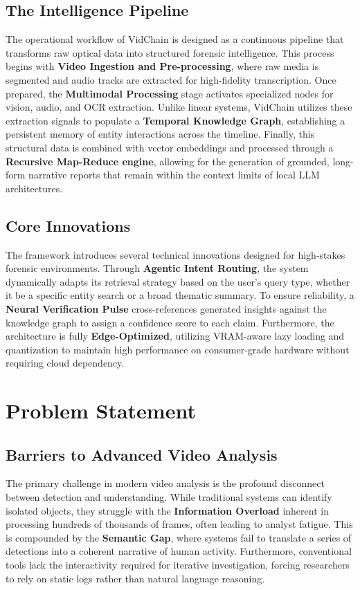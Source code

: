 \subsection{The Intelligence Pipeline}
The operational workflow of VidChain is designed as a continuous pipeline that transforms raw optical data into structured forensic intelligence. This process begins with \textbf{Video Ingestion and Pre-processing}, where raw media is segmented and audio tracks are extracted for high-fidelity transcription. Once prepared, the \textbf{Multimodal Processing} stage activates specialized nodes for vision, audio, and OCR extraction. Unlike linear systems, VidChain utilizes these extraction signals to populate a \textbf{Temporal Knowledge Graph}, establishing a persistent memory of entity interactions across the timeline. Finally, this structural data is combined with vector embeddings and processed through a \textbf{Recursive Map-Reduce engine}, allowing for the generation of grounded, long-form narrative reports that remain within the context limits of local LLM architectures.

\subsection{Core Innovations}
The framework introduces several technical innovations designed for high-stakes forensic environments. Through \textbf{Agentic Intent Routing}, the system dynamically adapts its retrieval strategy based on the user's query type, whether it be a specific entity search or a broad thematic summary. To ensure reliability, a \textbf{Neural Verification Pulse} cross-references generated insights against the knowledge graph to assign a confidence score to each claim. Furthermore, the architecture is fully \textbf{Edge-Optimized}, utilizing VRAM-aware lazy loading and quantization to maintain high performance on consumer-grade hardware without requiring cloud dependency.

\section{Problem Statement}

\subsection{Barriers to Advanced Video Analysis}
The primary challenge in modern video analysis is the profound disconnect between detection and understanding. While traditional systems can identify isolated objects, they struggle with the \textbf{Information Overload} inherent in processing hundreds of thousands of frames, often leading to analyst fatigue. This is compounded by the \textbf{Semantic Gap}, where systems fail to translate a series of detections into a coherent narrative of human activity. Furthermore, conventional tools lack the interactivity required for iterative investigation, forcing researchers to rely on static logs rather than natural language reasoning.

